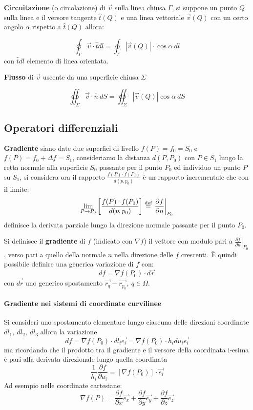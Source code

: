 \textbf{Circuitazione} (o circolazione) di $\vec{v}$ sulla linea chiusa $\Gamma$, si suppone un punto $Q$ sulla 
linea e il versore tangente $\hat{t}(Q)$ e una linea vettoriale $\vec{v}(Q)$ con un certo angolo
$\alpha$ rispetto a $\hat{t}(Q)$ allora:

$$
\oint_{\Gamma}  \vec{v}\cdot\hat{t}dl = 
\oint_{\Gamma}  \left|\vec{v}(Q)\right|\cdot\cos\alpha\ dl
$$
con $\hat{t}dl$ elemento di linea orientata.

\textbf{Flusso} di $\vec{v}$ uscente da una superficie chiusa $\Sigma$

$$
\oiint_{\Sigma}\vec{v}\cdot\hat{n}\ dS = \oiint_{\Sigma} \left|\vec{v}(Q)\right|\cos\alpha\ dS
$$

\subsection{Operatori differenziali}

\textbf{Gradiente} siano date due superfici di livello $f(P) = f_0 = S_0$ e
$f(P) = f_0 + \Delta f = S_1$, consideriamo la distanza $d(P,P_0)$ con 
$P\in S_1$ lungo la retta normale alla superficie $S_0$ passante per il punto 
$P_0$ ed individuo un punto $P$ su $S_1$, si considera ora il rapporto $\frac{f(P)\cdot f(P_0)}{d(p,p_0)}$ è un rapporto incrementale che con il limite:
$$
\lim_{P\to P_0} \left[\frac{f(P)\cdot f(P_0)}{d(p,p_0)}\right] \stackrel{\text{\text{def}}}{=} \left.\frac{\partial f}{\partial n}\right|_{P_0} 
$$
definisce la derivata parziale lungo la direzione normale passante per il punto $P_0$.

Si definisce il \textbf{gradiente} di $f$ (indicato con $\nabla f$) il vettore con modulo pari a 
$\left.\frac{\partial f}{\partial n}\right|_{P_0}$, verso pari a quello della
normale $n$ nella direzione delle $f$ crescenti.
È quindi possibile definire una generica variazione di $f$ con:
$$
df = \nabla f(P_0)\cdot d\vec{r}
$$
con $\vec{dr}$ uno generico spostamento $\vec{r_q} - \vec{r_{p_0}},\ q\in\Omega$.

\paragraph{Gradiente nei sistemi di coordinate curvilinee}
Si consideri uno spostamento elementare lungo ciascuna delle direzioni coordinate
$dl_1,\ dl_2,\ dl_3$ allora la variazione
$$
df = \nabla f (P_0) \cdot dl_i\vec{e_i} = \nabla f(P_0) \cdot h_i du_i\vec{e_i} 
$$
ma ricordando che il prodotto tra il gradiente e il versore della coordinata i-esima è pari
alla derivata direzionale lungo quella coordinata
$$
\frac{1}{h_i} \frac{\partial f}{\partial u_i} = \left[\nabla f (P_0)\right]\cdot \vec{e_i}
$$
Ad esempio nelle coordinate cartesiane:
$$
\nabla f(P) = \frac{\partial f}{\partial x}\vec{e_x} + \frac{\partial f}{\partial y}\vec{e_y} + 
\frac{\partial f}{\partial z}\vec{e_z}
$$


